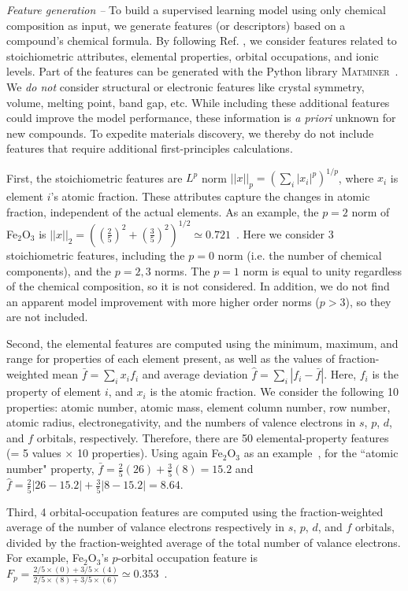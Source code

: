 	{\it Feature generation --} To build a supervised learning model using only chemical composition as input, we generate features (or descriptors) based on a compound's chemical formula. By following Ref. \cite{ward2016general}, we consider features related to stoichiometric attributes, elemental properties, orbital occupations, and ionic levels.
	Part of the features can be generated with the Python library \textsc{Matminer}~\cite{matminer}. 
	We {\emph{do not}} consider structural or electronic features like crystal symmetry, volume, melting point, band gap, etc. While including these additional features could improve the model performance, these information is {\textit {a priori}} unknown for new compounds. To expedite materials discovery, we thereby do not include features that require additional first-principles calculations.
	
	First, the stoichiometric features are $L^p$ norm $||x||_p = (\sum_i |x_i|^p)^{1/p}$, where $x_i$ is element $i$'s atomic fraction. These attributes capture the changes in atomic fraction, independent of the actual elements. As an example, the $p=2$ norm of Fe$_2$O$_3$ is $||x||_2 = \left((\frac{2}{5})^{2} + (\frac{3}{5})^2\right)^{1/2} \simeq 0.721$~\cite{ward2016general}. Here we consider 3 stoichiometric features, including the $p=0$ norm (i.e. the number of chemical components), and the $p=2, 3$ norms. The $p=1$ norm is equal to unity regardless of the chemical composition, so it is not considered. In addition, we do not find an apparent model improvement with more higher order norms ($p>3$), so they are not included.
	
	Second, the elemental features are computed using the minimum, maximum, and range for properties of each element present, as well as the values of fraction-weighted mean $\bar f = \sum_i x_i f_i$ and average deviation $\hat f = \sum_i | f_i - \bar f|$. Here, $f_i$ is the property of element $i$, and $x_i$ is the atomic fraction. We consider the following 10 properties: atomic number, atomic mass, element column number, row number, atomic radius, electronegativity, and the numbers of valence electrons in $s$, $p$, $d$, and $f$ orbitals, respectively. Therefore, there are 50 elemental-property features (= 5 values $\times$ 10 properties).
	Using again Fe$_2$O$_3$ as an example~\cite{ward2016general}, for the ``atomic number" property, $\bar f = \frac{2}{5}(26) + \frac{3}{5}(8) = 15.2$ and $\hat f = \frac{2}{5}|26 - 15.2| + \frac{3}{5}|8-15.2|= 8.64$. 
	
	Third, 4 orbital-occupation features are computed using the fraction-weighted average of the number of valance electrons respectively in $s$, $p$, $d$, and $f$ orbitals, divided by the fraction-weighted average of the total number of valance electrons. For example, Fe$_2$O$_3$'s $p$-orbital occupation feature is $F_p = \frac{2/5\times(0) + 3/5\times(4)}{2/5\times(8)+3/5\times(6)} \simeq 0.353$~\cite{ward2016general}.
	
